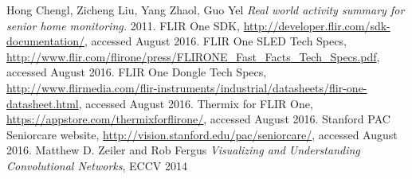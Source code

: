 \documentclass[oneside, twocolumn]{article}
\begin{document}
\begin{thebibliography}{99}

 Hong Chengl, Zicheng Liu, Yang Zhaol, Guo Yel  {\em Real world activity summary for senior home monitoring.}  2011.
FLIR One SDK, {\url{http://developer.flir.com/sdk-documentation/}}, accessed August 2016.
FLIR One SLED Tech Specs, {\url{http://www.flir.com/flirone/press/FLIRONE_Fast_Facts_Tech_Specs.pdf}}, accessed August 2016.
FLIR One Dongle Tech Specs, {\url{http://www.flirmedia.com/flir-instruments/industrial/datasheets/flir-one-datasheet.html}}, accessed August 2016.
Thermix for FLIR One, {\url{https://appstore.com/thermixforflirone/}}, accessed August 2016.
 Stanford PAC Seniorcare website, {\url{http://vision.stanford.edu/pac/seniorcare/}}, accessed August 2016.
 Matthew D. Zeiler and Rob Fergus {\em Visualizing and Understanding Convolutional Networks}, ECCV 2014

\end{thebibliography}

\end{document}
